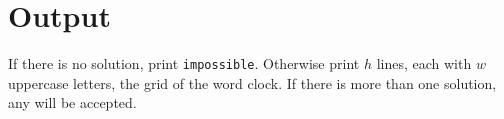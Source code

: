 
\section*{Output}

If there is no solution, print \texttt{impossible}.
Otherwise print $h$ lines, each with $w$ uppercase letters, the grid of the word clock.
If there is more than one solution, any will be accepted.

